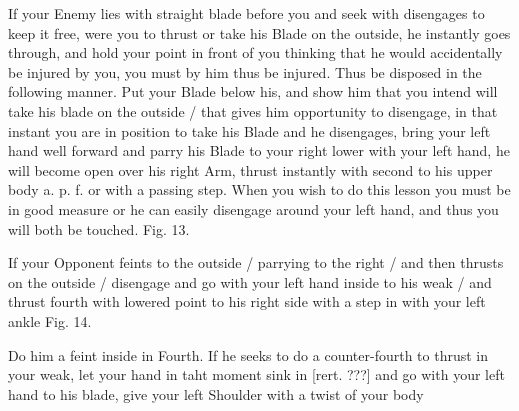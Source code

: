 \newpage


\newpage

\exercise{}
If your Enemy lies with straight blade before you and seek with
disengages to keep it free, were you to thrust or take his Blade on
the outside, he instantly goes through, and hold your point in front
of you thinking that he would accidentally be injured by you, you must
by him thus be injured. Thus be disposed in the following manner. Put
your Blade below his, and show him that you intend will take his blade
on the outside / that gives him
opportunity to disengage, in that instant you are in position to take his Blade and he disengages, bring your left hand well forward and parry his Blade to your right lower with your left hand, he will become open over his right Arm, thrust instantly with second to his upper body a. p. f. or with a passing step. When you wish to do this lesson you must be in good measure or he can easily disengage around your left hand, and thus you will both be touched. Fig. 13.

\exercise{}
If your Opponent feints to the outside / parrying to the right / and
then thrusts on the outside / disengage and go with your left hand
inside to his weak / and thrust fourth with lowered point to his right
side with a step in with your left ankle Fig. 14.

\exercise{}
Do him a feint inside in Fourth. If he seeks to do a counter-fourth to thrust in your weak, let your hand in taht moment sink in [rert. ???] and go with your left hand to his blade, give your left Shoulder with a twist of your body
